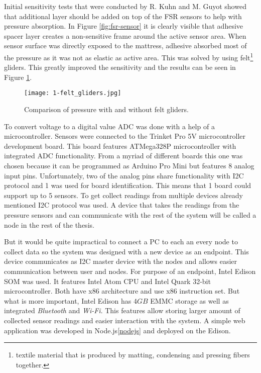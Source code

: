 Initial sensitivity tests that were conducted by R. Kuhn and M. Guyot showed that additional layer should be added on top of the \ac{FSR} sensors to help with pressure absorption. In Figure \ref{fig:fsr-sensor} it is clearly visible that adhesive spacer layer creates a non-sensitive frame around the active sensor area. When sensor surface was directly exposed to the mattress, adhesive absorbed most of the pressure as it was not as elastic as active area. This was solved by using felt\footnote{textile material that is produced by matting, condensing and pressing fibers together.} gliders. This greatly improved the sensitivity and the results can be seen in Figure \ref{fig:felt_gliders}.

\begin{figure}[h]
  \begin{center}
    \texttt{[image: 1-felt\_gliders.jpg]}
  \end{center}
  \caption{Comparison of pressure with and without felt gliders.}
  \label{fig:felt_gliders}
\end{figure}

To convert voltage to a digital value \ac{ADC} was done with a help of a microcontroller. Sensors were connected to the Trinket Pro 5V microcontroller development board\cite{Trinket}. This board features ATMega328P microcontroller with integrated \ac{ADC} functionality\cite{atmega328p}. From a myriad of different boards this one was chosen because it can be programmed as Arduino Pro Mini but features 8 analog input pins. Unfortunately, two of the analog pins share functionality with \ac{I2C} protocol and 1 was used for board identification. This means that 1 board could support up to 5 sensors. To get collect readings from multiple devices already mentioned \ac{I2C} protocol was used. A device that takes the readings from the pressure sensors and can communicate with the rest of the system will be called a node in the rest of the thesis.

But it would be quite impractical to connect a PC to each an every node to collect data so the system was designed with a new device as an endpoint. This device communicates as \ac{I2C} master device with the nodes and allows easier communication between user and nodes. For purpose of an endpoint, Intel Edison \ac{SOM} was used. It features Intel Atom \ac{CPU} and Intel Quark 32-bit microcontroller\cite{Edison}. Both have x86 architecture and use x86 instruction set. But what is more important, Intel Edison has $4GB$ \ac{EMMC} storage as well as integrated \textit{Bluetooth} and \textit{Wi-Fi}. This features allow storing larger amount of collected sensor readings and easier interaction with the system. A simple web application was developed in Node.js\ref{nodejs} and deployed on the Edison.

